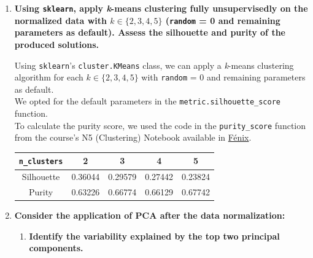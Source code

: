 \documentclass[12pt]{article}
\begin{document}
\begin{enumerate}[leftmargin=\labelsep]
  \item \textbf{Using \texttt{sklearn}, apply \textit{k}-means clustering fully unsupervisedly on the normalized data with
          $k \in \{2,3,4,5\}$ (\textnormal{\texttt{random} = 0} and remaining parameters as default).
          Assess the silhouette and purity of the produced solutions.}

        \vskip 0.3cm
        Using \texttt{sklearn}'s \texttt{cluster.KMeans} class, we can apply a \textit{k}-means clustering algorithm
        for each $k \in \{2,3,4,5\}$ with \texttt{random} = 0 and remaining parameters as default. \\
        We opted for the default parameters in the \texttt{metric.silhouette\_score} function. \\
        To calculate the purity score, we used the code in the \texttt{purity\_score} function from the
        course's N5 (Clustering) Notebook available in
        \href{https://fenix.tecnico.ulisboa.pt/disciplinas/Apre2/2023-2024/1-semestre/notebooks}{Fénix}.

        

        \begin{center}
          \captionsetup{type=table}
          \begin{tabular}{c|cccc}
            \texttt{n\_clusters} & 2       & 3       & 4       & 5       \\
            \hline
            Silhouette           & 0.36044 & 0.29579 & 0.27442 & 0.23824 \\
            Purity               & 0.63226 & 0.66774 & 0.66129 & 0.67742
          \end{tabular}
          \label{exII1-silhouette-purity}
        \end{center}

  \item \textbf{Consider the application of PCA after the data normalization:}

        \begin{enumerate}
          \item \textbf{Identify the variability explained by the top two principal components.}

                \vskip 0.3cm
                


\end{enumerate}
\end{enumerate}
\end{document}
